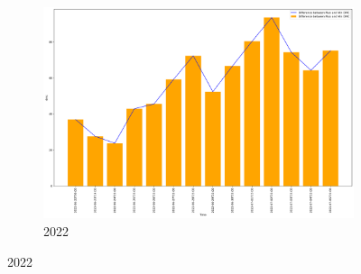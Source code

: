 \begin{figure}[h]
\begin{subfigure}{0.45\textwidth}
		\includegraphics[width=\textwidth]{graphs/2022/DMC_DIFFmaxMin.png}
		\caption{2022}
	\end{subfigure}
	\label{fig:daily_dmc_dif_maxmin}
\end{figure}

